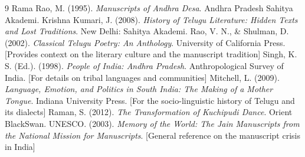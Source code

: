 \documentclass{article}
\begin{document}
\begin{thebibliography}{9}
 Rama Rao, M. (1995). \textit{Manuscripts of Andhra Desa}. Andhra Pradesh Sahitya Akademi.
 Krishna Kumari, J. (2008). \textit{History of Telugu Literature: Hidden Texts and Lost Traditions}. New Delhi: Sahitya Akademi.
 Rao, V. N., \& Shulman, D. (2002). \textit{Classical Telugu Poetry: An Anthology}. University of California Press. [Provides context on the literary culture and the manuscript tradition]
 Singh, K. S. (Ed.). (1998). \textit{People of India: Andhra Pradesh}. Anthropological Survey of India. [For details on tribal languages and communities]
 Mitchell, L. (2009). \textit{Language, Emotion, and Politics in South India: The Making of a Mother Tongue}. Indiana University Press. [For the socio-linguistic history of Telugu and its dialects]
 Raman, S. (2012). \textit{The Transformation of Kuchipudi Dance}. Orient BlackSwan.
 UNESCO. (2003). \textit{Memory of the World: The Jain Manuscripts from the National Mission for Manuscripts}. [General reference on the manuscript crisis in India]
\end{thebibliography}
\end{document}
